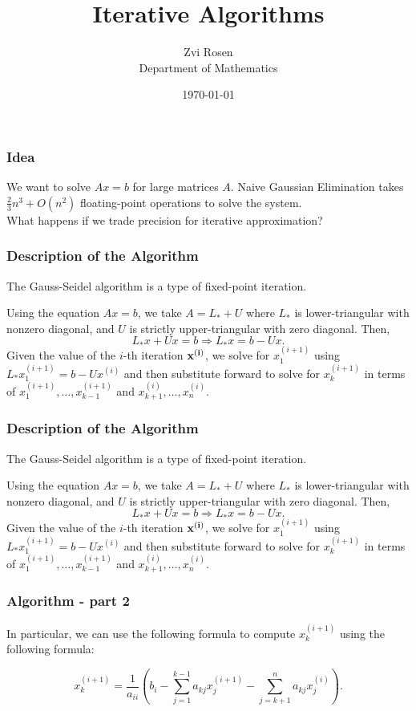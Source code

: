 \documentclass[12pt]{beamer}
\theoremstyle{definition}
\begin{document}
\author[Z. Rosen]{Zvi Rosen \\ Department of Mathematics}

\date[\today]{\today}
\title[Iterative Algorithms]{{\Large Iterative Algorithms}}


\frame{\titlepage}


\begin{frame}
\frametitle{Idea}
We want to solve $Ax = b$ for large matrices $A$. Naive Gaussian
Elimination takes $\frac{2}{3}n^3+ O(n^2)$ floating-point 
operations to solve the system. \\[1cm]

What happens if we trade precision for iterative approximation?
\end{frame}

\begin{frame}
\frametitle{Description of the Algorithm}

The Gauss-Seidel algorithm is a type of fixed-point iteration.

Using the equation $Ax = b$, we take $A = L_* + U$ where $L_*$ is
lower-triangular with nonzero diagonal, and $U$ is strictly 
upper-triangular with zero diagonal. Then,
\[ L_* x + Ux = b \Rightarrow L_*x = b - Ux.\]
Given the value of the $i$-th iteration
${\bf x^{(i)}}$, we solve for $x_1^{(i+1)}$ using $L_*x_1^{(i+1)} = b - Ux^{(i)}$  and then substitute forward to solve for 
$x_{k}^{(i+1)}$ in terms of $x_1^{(i+1)},\ldots,x_{k-1}^{(i+1)}$ and $x_{k+1}^{(i)},\ldots,x_{n}^{(i)}$.

\end{frame}


\begin{frame}
\frametitle{Description of the Algorithm}

The Gauss-Seidel algorithm is a type of fixed-point iteration.

Using the equation $Ax = b$, we take $A = L_* + U$ where $L_*$ is
lower-triangular with nonzero diagonal, and $U$ is strictly 
upper-triangular with zero diagonal. Then,
\[ L_* x + Ux = b \Rightarrow L_*x = b - Ux.\]
Given the value of the $i$-th iteration
${\bf x^{(i)}}$, we solve for $x_1^{(i+1)}$ using $L_*x_1^{(i+1)} = b - Ux^{(i)}$  and then substitute forward to solve for 
$x_{k}^{(i+1)}$ in terms of $x_1^{(i+1)},\ldots,x_{k-1}^{(i+1)}$ and $x_{k+1}^{(i)},\ldots,x_{n}^{(i)}$.

\end{frame}

\begin{frame}
\frametitle{Algorithm - part 2}

In particular, we can use the following formula to compute $x_k^{(i+1)}$
using the following formula:

\[x_k^{(i+1)} = \dfrac{1}{a_{ii}}\left( b_i - \sum_{j=1}^{k-1} a_{kj} x_j^{(i+1)}
- \sum_{j = k + 1}^n a_{kj} x_j^{(i)}\right).\]

\end{frame}
\end{document}
